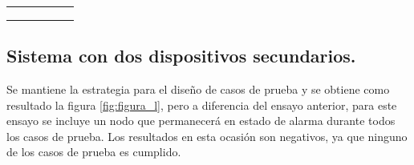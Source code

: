 \begin{table}[h]
\begin{tabular}{clcllc}
                                                                  &                                                                                   &                          & \multicolumn{2}{l}{}                                                                                                                                                                                                                                                                                            &                                                                                                                          \\
                                                                  &                                                                                   &                          & \multicolumn{2}{l}{}                                                                                                                                                                                                                                                                                            &                                                                                                                          \\
\multicolumn{1}{l}{}                                              &                                                                                   & \multicolumn{1}{l}{}     &                                                                                                                                                        &                                                                                                                                                        & \multicolumn{1}{l}{}                                                                                                    
\\
\bottomrule
\hline                                                                        
\end{tabular}
\label{tab:tabla_4_2}
\end{table}

\subsection{Sistema con dos dispositivos secundarios.}

Se mantiene la estrategia para el diseño de casos de prueba y se obtiene como resultado la figura \ref{fig:figura_l}, pero a diferencia del ensayo anterior, para este ensayo se incluye un nodo que permanecerá en estado de alarma durante todos los casos de prueba. Los resultados en esta ocasión son negativos, ya que ninguno de los casos de prueba es cumplido.

